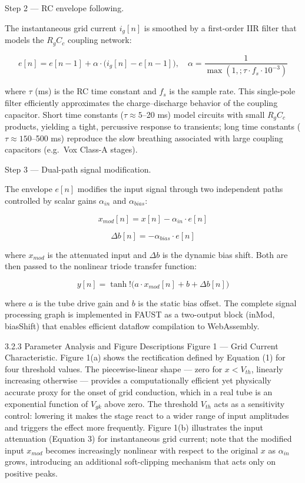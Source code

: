 Step 2 — RC envelope following.

The instantaneous grid current $i_g[n]$ is smoothed by a first-order IIR filter that models the $R_g C_c$ coupling network:

$$ e[n] = e[n-1] + \alpha \cdot \bigl(i_g[n] - e[n-1]\bigr), \quad \alpha = \frac{1}{\max(1,; \tau \cdot f_s \cdot 10^{-3})} \tag{2} $$

where $\tau$ (ms) is the RC time constant and $f_s$ is the sample rate. This single-pole filter efficiently approximates the charge–discharge behavior of the coupling capacitor. Short time constants ($\tau \approx 5$–20 ms) model circuits with small $R_g C_c$ products, yielding a tight, percussive response to transients; long time constants ($\tau \approx 150$–500 ms) reproduce the slow breathing associated with large coupling capacitors (e.g.\ Vox Class-A stages).

Step 3 — Dual-path signal modification.

The envelope $e[n]$ modifies the input signal through two independent paths controlled by scalar gains $\alpha_{in}$ and $\alpha_{bias}$:

$$ x_{mod}[n] = x[n] - \alpha_{in} \cdot e[n] \tag{3} $$

$$ \Delta b[n] = -\alpha_{bias} \cdot e[n] \tag{4} $$

where $x_{mod}$ is the attenuated input and $\Delta b$ is the dynamic bias shift. Both are then passed to the nonlinear triode transfer function:

$$ y[n] = \tanh!\bigl(a \cdot x_{mod}[n] + b + \Delta b[n]\bigr) \tag{5} $$

where $a$ is the tube drive gain and $b$ is the static bias offset. The complete signal processing graph is implemented in FAUST as a two-output block (inMod, biasShift) that enables efficient dataflow compilation to WebAssembly.

3.2.3 Parameter Analysis and Figure Descriptions
Figure 1 — Grid Current Characteristic. Figure 1(a) shows the rectification defined by Equation (1) for four threshold values. The piecewise-linear shape — zero for $x < V_{th}$, linearly increasing otherwise — provides a computationally efficient yet physically accurate proxy for the onset of grid conduction, which in a real tube is an exponential function of $V_{gk}$ above zero. The threshold $V_{th}$ acts as a sensitivity control: lowering it makes the stage react to a wider range of input amplitudes and triggers the effect more frequently. Figure 1(b) illustrates the input attenuation (Equation 3) for instantaneous grid current; note that the modified input $x_{mod}$ becomes increasingly nonlinear with respect to the original $x$ as $\alpha_{in}$ grows, introducing an additional soft-clipping mechanism that acts only on positive peaks.

